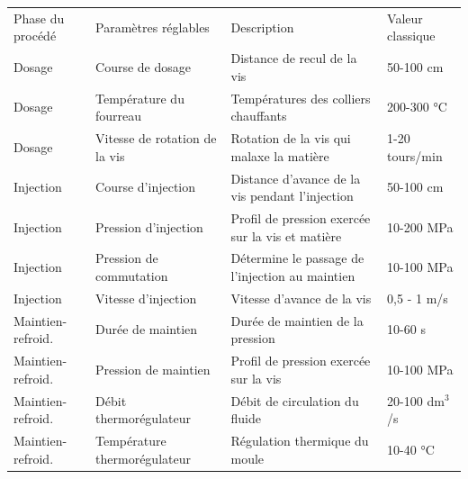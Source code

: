 \begin{table}[thbp]
	\centering
	\hspace*{-14mm}
	\begin{tabular}{|llll|}
		\arrayrulecolor{black}
		\hhline{----}
		Phase du procédé & Paramètres réglables & Description & Valeur classique \\ \hhline{=:=:=:=:} %
		Dosage                   & Course de dosage                 & Distance de recul de la vis                                                    & 50-100 cm                      \\
		Dosage                   & Température du fourreau          & Températures des colliers chauffants                                   & 200-300 °C                     \\
		Dosage                   & Vitesse de rotation de la vis    & Rotation de la vis qui malaxe la matière                                                      & 1-20 tours/min                 \\
		Injection                & Course d'injection               & Distance d'avance de la vis pendant l'injection                                               & 50-100 cm                      \\
		Injection                & Pression d'injection             & Profil de pression exercée sur la vis et matière                            & 10-200 MPa                     \\
		Injection                & Pression de commutation          & Détermine le passage de l'injection au maintien & 10-100 MPa                     \\
		Injection                & Vitesse d'injection              & Vitesse d'avance de la vis                                                & 0,5 - 1 m/s                    \\
		Maintien-refroid. & Durée de maintien                & Durée de maintien de la pression                                                & 10-60 s                        \\
		Maintien-refroid. & Pression de maintien             & Profil de pression exercée sur la vis                            & 10-100 MPa                     \\
		Maintien-refroid. & Débit thermorégulateur           & Débit de circulation du fluide                    & 20-100 dm$^3$/s \\
		Maintien-refroid. & Température thermorégulateur     & Régulation thermique du moule                           & 10-40 °C                       \\

\end{tabular}
\end{table}
